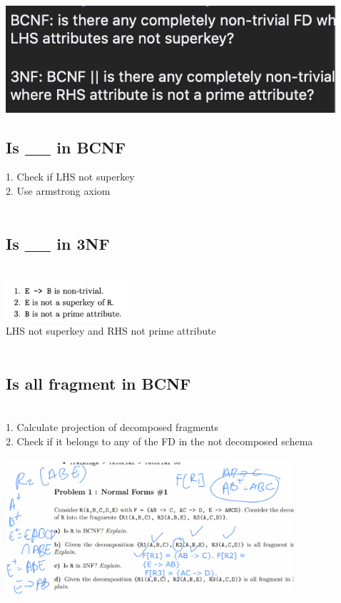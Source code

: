 \documentclass[11pt]{article}
\begin{document}
\setlength{\columnsep}{1cm}
\begin{multicols*}{3}
\\
\includegraphics{images/b1}
\\\subsection*{Is \_\_ in BCNF}
1. Check if LHS not superkey \\
2. Use armstrong axiom\\
\\\subsection*{Is \_\_ in 3NF}
\\
\includegraphics[height=1.5cm]{images/b5}\\
LHS not superkey and RHS not prime attribute
\\\\
\subsection*{Is all fragment in BCNF}\\
1. Calculate projection of decomposed fragments\\
2. Check if it belongs to any of the FD in the not decomposed schema\\\\
\includegraphics[height=5cm]{images/b2}

\end{multicols*}
\end{document}
